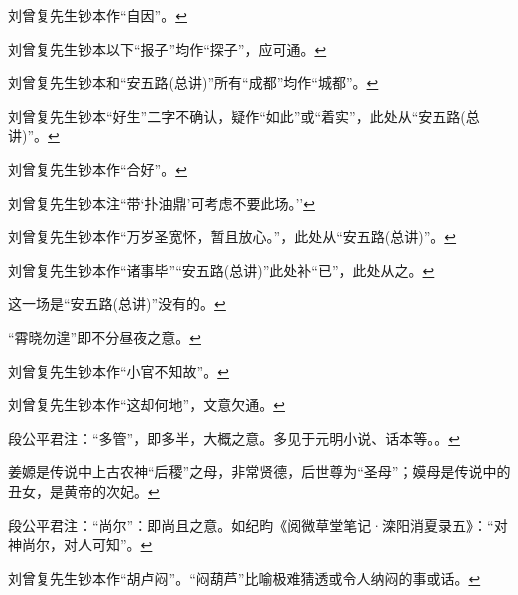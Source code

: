   \leavevmode\hypertarget{fn228}{}%
  刘曾复先生钞本作``自因''。\protect\hyperlink{fnref228}{↩}
\item
  \leavevmode\hypertarget{fn229}{}%
  刘曾复先生钞本以下``报子''均作``探子''，应可通。\protect\hyperlink{fnref229}{↩}
\item
  \leavevmode\hypertarget{fn230}{}%
  刘曾复先生钞本和``安五路(总讲)''所有``成都''均作``城都''。\protect\hyperlink{fnref230}{↩}
\item
  \leavevmode\hypertarget{fn231}{}%
  刘曾复先生钞本``好生''二字不确认，疑作``如此''或``着实''，此处从``安五路(总讲)''。\protect\hyperlink{fnref231}{↩}
\item
  \leavevmode\hypertarget{fn232}{}%
  刘曾复先生钞本作``合好''。\protect\hyperlink{fnref232}{↩}
\item
  \leavevmode\hypertarget{fn233}{}%
  刘曾复先生钞本注``带`扑油鼎'可考虑不要此场。''\protect\hyperlink{fnref233}{↩}
\item
  \leavevmode\hypertarget{fn234}{}%
  刘曾复先生钞本作``万岁圣宽怀，暂且放心。''，此处从``安五路(总讲)''。\protect\hyperlink{fnref234}{↩}
\item
  \leavevmode\hypertarget{fn235}{}%
  刘曾复先生钞本作``诸事毕''``安五路(总讲)''此处补``已''，此处从之。\protect\hyperlink{fnref235}{↩}
\item
  \leavevmode\hypertarget{fn236}{}%
  这一场是``安五路(总讲)''没有的。\protect\hyperlink{fnref236}{↩}
\item
  \leavevmode\hypertarget{fn237}{}%
  ``霄晓勿遑''即不分昼夜之意。\protect\hyperlink{fnref237}{↩}
\item
  \leavevmode\hypertarget{fn238}{}%
  刘曾复先生钞本作``小官不知故''。\protect\hyperlink{fnref238}{↩}
\item
  \leavevmode\hypertarget{fn239}{}%
  刘曾复先生钞本作``这却何地''，文意欠通。\protect\hyperlink{fnref239}{↩}
\item
  \leavevmode\hypertarget{fn240}{}%
  段公平君注：``多管''，即多半，大概之意。多见于元明小说、话本等。。\protect\hyperlink{fnref240}{↩}
\item
  \leavevmode\hypertarget{fn241}{}%
  姜嫄是传说中上古农神``后稷''之母，非常贤德，后世尊为``圣母''；嫫母是传说中的丑女，是黄帝的次妃。\protect\hyperlink{fnref241}{↩}
\item
  \leavevmode\hypertarget{fn242}{}%
  段公平君注：``尚尔''：即尚且之意。如纪昀《阅微草堂笔记·滦阳消夏录五》：``对神尚尔，对人可知''。\protect\hyperlink{fnref242}{↩}
\item
  \leavevmode\hypertarget{fn243}{}%
  刘曾复先生钞本作``胡卢闷''。``闷葫芦''比喻极难猜透或令人纳闷的事或话。\protect\hyperlink{fnref243}{↩}
